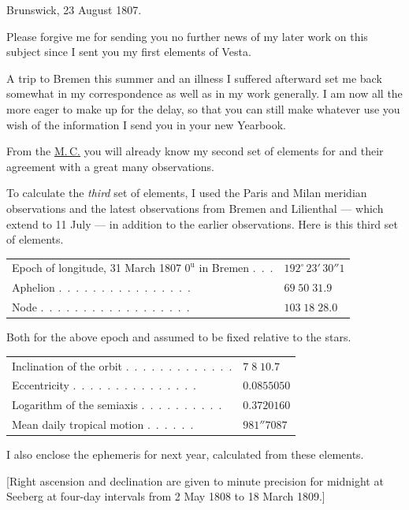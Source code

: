 \clearpage
{}
\hypertarget{native-289-lower}{}
\begin{flushright}
Brunswick, 23 August 1807.
\end{flushright}

\par\indent Please forgive me for sending you no further news of my later work on this subject since I sent you my first elements of Vesta.
%
\par\indent A trip to Bremen this summer and an illness I suffered afterward set me back somewhat in my correspondence as well as in my work generally. I am now all the more eager to make up for the delay, so that you can still make whatever use you wish of the information I send you in your new Yearbook.

\par\indent From the \href{https://zs.thulb.uni-jena.de/rsc/viewer/jportal_derivate_00237836/Monatliche_Correspondenz_130168688_15_1807_0605.tif}{M.\,C.} you will already know my second set of elements for \VestaBodyTwoNinety{} and their agreement with a great many observations.

\par\indent To calculate the \emph{third} set of elements, I used the Paris and Milan meridian observations and the latest observations from Bremen and Lilienthal --- which extend to 11 July --- in addition to the earlier observations. Here is this third set of elements.

\begin{center}\begingroup\fontsize{9}{11}\selectfont
\begin{tabular}{ll}
\shortstack[l]{Epoch of longitude, 31 March 1807\\$0^{\text{u}}$ in Bremen} .\ .\ . & $192^\circ\,23'\,30''1$ \\
Aphelion .\ .\ .\ .\ .\ .\ .\ .\ .\ .\ .\ .\ .\ .\ .\ . & $69\;50\;31.9$ \\
Node .\ .\ .\ .\ .\ .\ .\ .\ .\ .\ .\ .\ .\ .\ .\ .\ .\ . & $103\;18\;28.0$
\end{tabular}\endgroup\end{center}

\noindent Both for the above epoch and assumed to be fixed relative to the stars.

\begin{center}\begingroup\fontsize{9}{11}\selectfont
\begin{tabular}{ll}
Inclination of the orbit .\ .\ .\ .\ .\ .\ .\ .\ .\ .\ .\ .\ . & $7\;8\;10.7$ \\
Eccentricity .\ .\ .\ .\ .\ .\ .\ .\ .\ .\ .\ .\ .\ .\ . & $0.0855050$ \\
Logarithm of the semiaxis .\ .\ .\ .\ .\ .\ .\ .\ .\ . & $0.3720160$ \\
Mean daily tropical motion .\ .\ .\ .\ .\ . & $981''7087$
\end{tabular}\endgroup\end{center}

\par\indent I also enclose the ephemeris for next year, calculated from these elements.

[Right ascension and declination are given to minute precision for midnight at Seeberg at four-day intervals from 2 May 1808 to 18 March 1809.]

